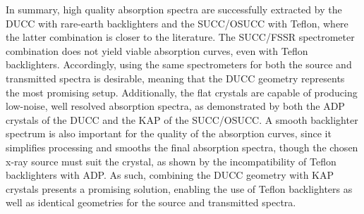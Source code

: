 In summary, high quality absorption spectra are successfully extracted by the DUCC with rare-earth backlighters and the SUCC/OSUCC with Teflon, where the latter combination is closer to the literature. The SUCC/FSSR spectrometer combination does not yield viable absorption curves, even with Teflon backlighters. Accordingly, using the same spectrometers for both the source and transmitted spectra is desirable, meaning that the DUCC geometry represents the most promising setup. Additionally, the flat crystals are capable of producing low-noise, well resolved absorption spectra, as demonstrated by both the ADP crystals of the DUCC and the KAP of the SUCC/OSUCC. A smooth backlighter spectrum is also important for the quality of the absorption curves, since it simplifies processing and smooths the final absorption spectra, though the chosen x-ray source must suit the crystal, as shown by the incompatibility of Teflon backlighters with ADP. As such, combining the DUCC geometry with KAP crystals presents a promising solution, enabling the use of Teflon backlighters as well as identical geometries for the source and transmitted spectra.


